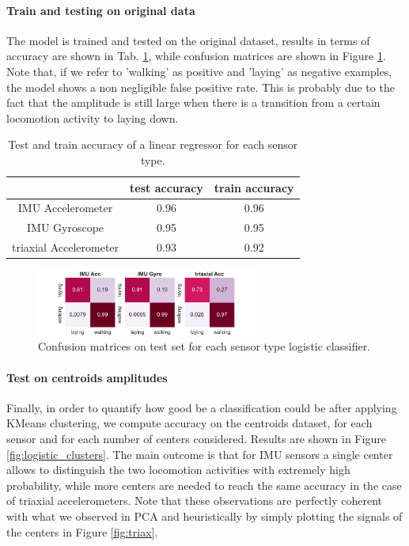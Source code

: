 \documentclass[10pt, a4paper, twocolumn]{article}
\theoremstyle{definition}
\begin{document}
\paragraph{Train and testing on original data} The model is trained and tested on the original dataset, results in terms of accuracy are shown in Tab. \ref{tab:regressortrain}, while confusion matrices are shown in Figure \ref{fig:cmatlogistic}. Note that, if we refer to  'walking' as positive and 'laying' as negative examples, the model shows a non negligible false positive rate. This is probably due to the fact that the amplitude is still large when there is a transition from a certain locomotion activity to laying down.

\begin{table}[]\centering
\begin{tabular}{c|cc}
                       & test accuracy & train accuracy \\ \hline
IMU Accelerometer      & 0.96          & 0.96           \\
IMU Gyroscope          & 0.95          & 0.95           \\
triaxial Accelerometer & 0.93          & 0.92          
\end{tabular}\caption{Test and train accuracy of a linear regressor for each sensor type. }\label{tab:regressortrain}
\end{table}

\begin{figure} \centering
         \includegraphics[width=0.65\textwidth]{../clustering/clustering_results_euclidean/confusion_matrix_test.pdf}
    \caption{Confusion matrices on test set for each sensor type logistic classifier.  }\label{fig:cmatlogistic}
\end{figure}


\paragraph{Test on centroids amplitudes} Finally, in order to quantify how good be a classification could be after applying KMeans clustering, we compute accuracy on the centroids dataset, for each sensor and for each number of centers considered. Results are shown in Figure \ref{fig:logistic_clusters}. The main outcome is that for IMU sensors a single center allows to distinguish the two locomotion activities with extremely high probability, while more centers are needed to reach the same accuracy in the case of triaxial accelerometers. Note that these observations are perfectly coherent with what we observed in PCA and heuristically by simply plotting the signals of the centers in Figure \ref{fig:triax}.
\end{document}
